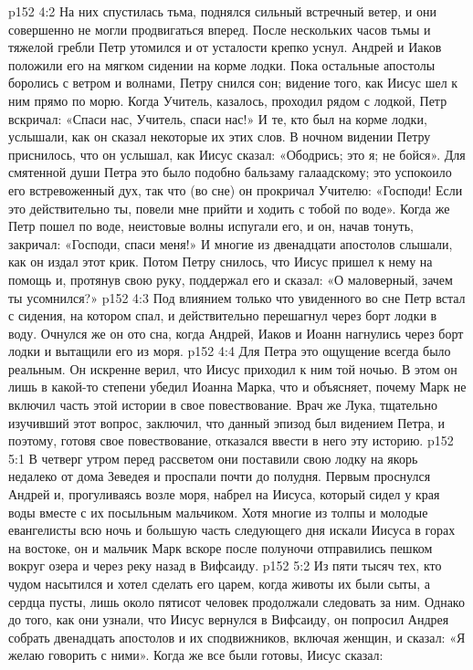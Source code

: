 \vs p152 4:2 На них спустилась тьма, поднялся сильный встречный ветер, и они совершенно не могли продвигаться вперед. После нескольких часов тьмы и тяжелой гребли Петр утомился и от усталости крепко уснул. Андрей и Иаков положили его на мягком сидении на корме лодки. Пока остальные апостолы боролись с ветром и волнами, Петру снился сон; видение того, как Иисус шел к ним прямо по морю. Когда Учитель, казалось, проходил рядом с лодкой, Петр вскричал: «Спаси нас, Учитель, спаси нас!» И те, кто был на корме лодки, услышали, как он сказал некоторые их этих слов. В ночном видении Петру приснилось, что он услышал, как Иисус сказал: «Ободрись; это я; не бойся». Для смятенной души Петра это было подобно бальзаму галаадскому; это успокоило его встревоженный дух, так что (во сне) он прокричал Учителю: «Господи! Если это действительно ты, повели мне прийти и ходить с тобой по воде». Когда же Петр пошел по воде, неистовые волны испугали его, и он, начав тонуть, закричал: «Господи, спаси меня!» И многие из двенадцати апостолов слышали, как он издал этот крик. Потом Петру снилось, что Иисус пришел к нему на помощь и, протянув свою руку, поддержал его и сказал: «О маловерный, зачем ты усомнился?»
\vs p152 4:3 Под влиянием только что увиденного во сне Петр встал с сидения, на котором спал, и действительно перешагнул через борт лодки в воду. Очнулся же он ото сна, когда Андрей, Иаков и Иоанн нагнулись через борт лодки и вытащили его из моря.
\vs p152 4:4 Для Петра это ощущение всегда было реальным. Он искренне верил, что Иисус приходил к ним той ночью. В этом он лишь в какой\hyp{}то степени убедил Иоанна Марка, что и объясняет, почему Марк не включил часть этой истории в свое повествование. Врач же Лука, тщательно изучивший этот вопрос, заключил, что данный эпизод был видением Петра, и поэтому, готовя свое повествование, отказался ввести в него эту историю.
\vs p152 5:1 В четверг утром перед рассветом они поставили свою лодку на якорь недалеко от дома Зеведея и проспали почти до полудня. Первым проснулся Андрей и, прогуливаясь возле моря, набрел на Иисуса, который сидел у края воды вместе с их посыльным мальчиком. Хотя многие из толпы и молодые евангелисты всю ночь и большую часть следующего дня искали Иисуса в горах на востоке, он и мальчик Марк вскоре после полуночи отправились пешком вокруг озера и через реку назад в Вифсаиду.
\vs p152 5:2 \pc Из пяти тысяч тех, кто чудом насытился и хотел сделать его царем, когда животы их были сыты, а сердца пусты, лишь около пятисот человек продолжали следовать за ним. Однако до того, как они узнали, что Иисус вернулся в Вифсаиду, он попросил Андрея собрать двенадцать апостолов и их сподвижников, включая женщин, и сказал: «Я желаю говорить с ними». Когда же все были готовы, Иисус сказал:
